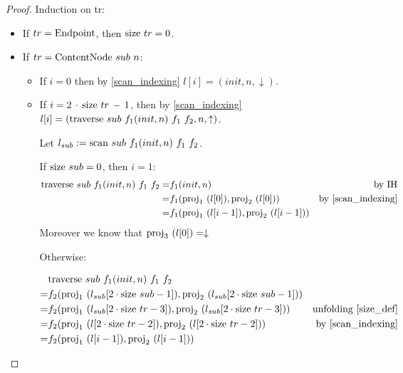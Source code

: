 \documentclass{article}
\newcommand{\textfun}[1]{\textup{#1}}
\newcommand{\fone}[2]{\ensuremath{f_{1}(#1, #2)}}
\newcommand{\ftwo}[2]{\ensuremath{f_{2}(#1, #2)}}
\newcommand{\nilNode}{\textfun{Endpoint}}
\newcommand{\contentNode}[2]{\textfun{ContentNode}\ #1\ #2}
\newcommand{\longtraverse}[4]{\textfun{traverse}\ #1\ #2\ #3 \ #4}
\newcommand{\longscan}[4]{\textfun{scan}\ #1\ #2\ #3 \ #4}
\newcommand{\up}{\uparrow}
\newcommand{\down}{\downarrow}
\newcommand{\size}[1]{\textfun{size}\ #1}
\newcommand{\fst}[1]{\textfun{proj}_1\ #1}
\newcommand{\snd}[1]{\textfun{proj}_2\ #1}
\newcommand{\trd}[1]{\textfun{proj}_3\ #1}
\begin{document}
\begin{proof}
Induction on tr:

\begin{itemize}
    \item If $tr = \nilNode$, then $\size{tr} = 0$.
    \item If $tr = \contentNode{sub}{n}$:
    
    \begin{itemize}
        \item If $i = 0$ then by \cref{scan_indexing} $l[i] = (init, n, \down)$.
        \item If $i = 2\, \cdot \, \size{tr} \, - \, 1$, then by \cref{scan_indexing} $l[i] = (\longtraverse{sub}{\fone{init}{n}}{f_1}{f_2}, n, \up)$.
        
              Let $l_{sub} := \longscan{sub}{\fone{init}{n}}{f_1}{f_2}$.

              If $\size{sub} = 0$, then $i = 1$:
              \begin{align*}
                \longtraverse{sub}{\fone{init}{n}}{f_1}{f_2} =& \fone{init}{n} & \text{by IH} \\
                                                            =& \fone{\fst{(l[0])}}{\snd{(l[0])}} & \text{by \cref{scan_indexing}} \\
                                                            =& \fone{\fst{(l[i - 1])}}{\snd{(l[i - 1])}}
              \end{align*}
              Moreover we know that $\trd{(l[0])} = \down$

                Otherwise:


              \begin{align*}
                &\longtraverse{sub}{\fone{init}{n}}{f_1}{f_2} \\
                =& \ftwo{\fst{(l_{sub}[2 \cdot \size{sub} - 1])}}{\snd{(l_{sub}[2 \cdot \size{sub} - 1])}} \\
                                                =& \ftwo{\fst{(l_{sub}[2 \cdot \size{tr} - 3])}}{\snd{(l_{sub}[2 \cdot \size{tr} - 3])}} & \text{unfolding \cref{size_def}} \\
                                                =& \ftwo{\fst{(l[2 \cdot \size{tr} - 2])}}{\snd{(l[2 \cdot \size{tr} - 2])}} & \text{by \cref{scan_indexing}} \\
                                                =& \ftwo{\fst{(l[i - 1])}}{\snd{(l[i - 1])}}
                                            \end{align*}


\end{itemize}
\end{itemize}
\end{proof}
\end{document}
